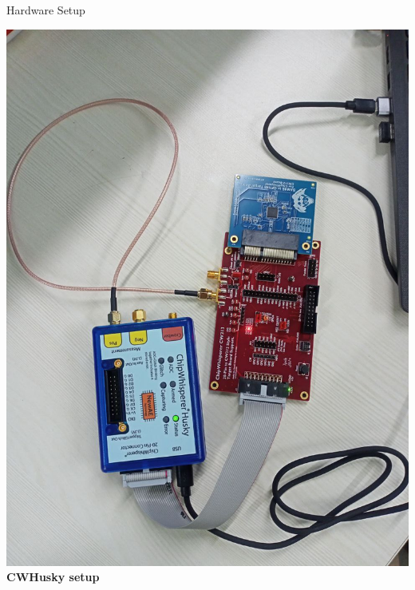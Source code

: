 \documentclass{beamer}
\newenvironment{tres important}[2][]{
	\setkeys{EmphEqEnv}{#2}
	\setkeys{EmphEqOpt}{box={\setlength{\fboxsep}{10pt}\fcolorbox{myNewColorA}{white}},#1}
	\EmphEqMainEnv}
{\endEmphEqMainEnv}
\begin{document}
\begin{frame}{Hardware Setup}
\begin{minipage}[b]{0.3\linewidth}
    \centering
    \includegraphics[width=\linewidth]{images/cwhusky_background.JPEG}
    \smallskip
    \textbf{CWHusky setup}
  \end{minipage}
\end{frame}
\end{document}
